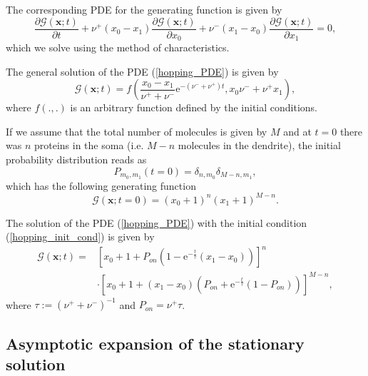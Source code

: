 \documentclass[a4paper, 11pt]{article}
\begin{document}
The corresponding PDE for the generating function is given by
\begin{equation}\label{hopping_PDE}
  \frac{\partial\mathcal G(\mathbf x; t)}{\partial t} + \nu^+(x_0-x_1)\frac{\partial\mathcal G(\mathbf x; t)}{\partial x_0} + \nu^-(x_1-x_0)\frac{\partial\mathcal G(\mathbf x; t)}{\partial x_1} = 0,
\end{equation}
which we solve using the method of characteristics.

The general solution of the PDE (\ref{hopping_PDE}) is given by
\begin{equation}
  \mathcal G(\mathbf x; t) = f\left(\frac{x_0-x_1}{\nu^++\nu^-}\mathrm e^{-(\nu^-+\nu^+)t}, x_0\nu^-+\nu^+x_1\right),
\end{equation}
where $f(.,.)$ is an arbitrary function defined by the initial conditions.

If we assume that the total number of molecules is given by $M$ and at $t=0$ there was $n$ proteins in the soma (i.e. $M-n$ molecules in the dendrite), the initial probability distribution reads as
\begin{equation}
  P_{m_0, m_1}(t=0) = \delta_{n,m_0}\delta_{M-n,m_1},
\end{equation}
which has the following generating function
\begin{equation}\label{hopping_init_cond}
  \mathcal G(\mathbf x; t=0) = (x_0+1)^n(x_1+1)^{M-n}.
\end{equation}

The solution of the PDE (\ref{hopping_PDE}) with the initial condition (\ref{hopping_init_cond}) is given by
\begin{equation}
  \begin{split}
    \mathcal G(\mathbf x; t) = &\left[x_0+1+P_{on}\left(1-\mathrm e^{-\frac{t}{\tau}}(x_1-x_0)\right)\right]^n\\
    &\cdot\left[x_0+1+(x_1-x_0)\left(P_{on}+\mathrm e^{-\frac{t}{\tau}}(1-P_{on})\right)\right]^{M-n},
  \end{split}
\end{equation}
where $\tau := (\nu^++\nu^-)^{-1}$ and $P_{on} = \nu^+\tau$.
\subsection{Asymptotic expansion of the stationary solution}
\end{document}
